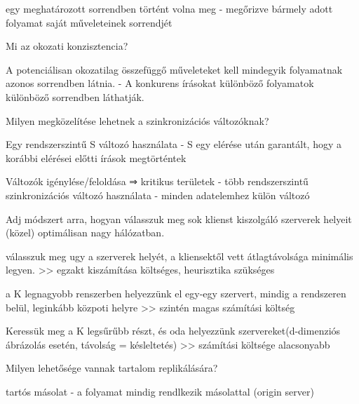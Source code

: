 \documentclass[12pt]{article}
\begin{document}
\begin{description}
                                        egy meghatározott sorrendben történt volna meg
                                        - megőrizve bármely adott folyamat saját műveleteinek sorrendjét
                                    \item  Mi az okozati konzisztencia?
                                    \item A potenciálisan okozatilag összefüggő műveleteket kell mindegyik folyamatnak azonos sorrendben látnia.
                                        - A konkurens írásokat különböző folyamatok különböző sorrendben láthatják.
                                    \item  Milyen megközelítése lehetnek a szinkronizációs változóknak?
                                    \item Egy rendszerszintű S változó használata
                                        - S egy elérése után garantált, hogy a korábbi elérései előtti írások megtörténtek
                                    \item Változók  igénylése/feloldása ⇒ kritikus területek
                                        - több rendszerszintű szinkronizációs változó használata
                                        - minden adatelemhez külön változó
                                    \item  Adj módszert arra, hogyan válasszuk meg sok klienst kiszolgáló szerverek helyeit (közel) optimálisan nagy hálózatban.
                                    \item válasszuk meg ugy a szerverek helyét, a kliensektől vett átlagtávolsága minimális legyen.
                                        >> egzakt kiszámítása költséges, heurisztika szükséges
                                    \item a K legnagyobb renszerben helyezzünk el egy-egy szervert, mindig a rendszeren belül, leginkább közpoti helyre
                                        >>  szintén magas számítási költség
                                    \item Keressük meg a K legsűrűbb részt, és oda helyezzünk szervereket(d-dimenziós ábrázolás esetén, távolság = késleltetés)
                                        >> számítási költsége alacsonyabb	
                                    \item  Milyen lehetősége vannak tartalom replikálására?
                                    \item tartós másolat
                                        - a folyamat mindig rendlkezik másolattal (origin server)

\end{description}
\end{document}
